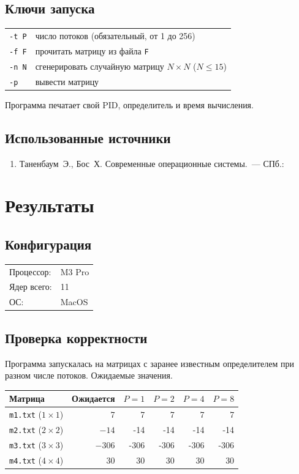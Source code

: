 \documentclass[pdf, unicode, 12pt, a4paper, oneside, fleqn]{article}
\begin{document}
\subsection*{Ключи запуска}

\begin{tabular}{ll}
\texttt{-t P} & число потоков (обязательный, от 1 до 256) \\
\texttt{-f F} & прочитать матрицу из файла \texttt{F} \\
\texttt{-n N} & сгенерировать случайную матрицу $N \times N$ ($N \le 15$) \\
\texttt{-p}   & вывести матрицу \\
\end{tabular}

Программа печатает свой PID, определитель и время вычисления.

\subsection*{Использованные источники}
{\sloppy
\begin{enumerate}[nosep]
    \item Таненбаум~Э., Бос~Х. Современные операционные системы.~--- СПб.:
\end{enumerate}
}

\section{Результаты}

\subsection*{Конфигурация}

\begin{tabular}{ll}
Процессор: & M3 Pro \\
Ядер всего: & 11 \\
ОС: & MacOS \\
\end{tabular}

\subsection*{Проверка корректности}

Программа запускалась на матрицах с заранее известным определителем при разном числе
потоков. Ожидаемые значения.

\begin{center}
\begin{tabular}{|l|r|r|r|r|r|}
\hline
\textbf{Матрица} & \textbf{Ожидается} & $P=1$ & $P=2$ & $P=4$ & $P=8$ \\ \hline
\texttt{m1.txt} ($1\times1$) & 7      & 7 & 7 & 7 & 7 \\ \hline
\texttt{m2.txt} ($2\times2$) & $-14$  & -14 & -14 & -14 & -14 \\ \hline
\texttt{m3.txt} ($3\times3$) & $-306$ & -306 & -306 & -306 & -306 \\ \hline
\texttt{m4.txt} ($4\times4$) & 30     & 30 & 30 & 30 & 30 \\ \hline
\end{tabular}
\end{center}
\end{document}
